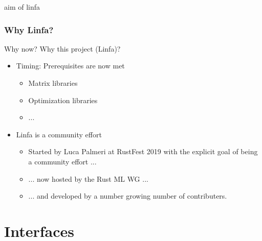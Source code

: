 \documentclass[xcolor=x11names,compress]{beamer}
\begin{document}
\begin{frame}{aim of linfa}
    \frametitle{Why Linfa?}
    Why now? Why this project (Linfa)?
    \begin{itemize}
        \item<2-> Timing: Prerequisites are now met
        \begin{itemize}[label=-]
            \item<3->{Matrix libraries}
	    \item<4->{Optimization libraries}
	    \item<5->{...}
        \end{itemize}
        \item<6->{Linfa is a community effort}
        \begin{itemize}[label=-]
            \item<7->{Started by Luca Palmeri at RustFest 2019 with the explicit goal of being a community effort ...}
	    \item<8->{... now hosted by the Rust ML WG ... }
	    \item<9->{... and developed by a number growing number of contributers.}
        \end{itemize}	
    \end{itemize}
\end{frame}

\section{Interfaces}
\end{document}
